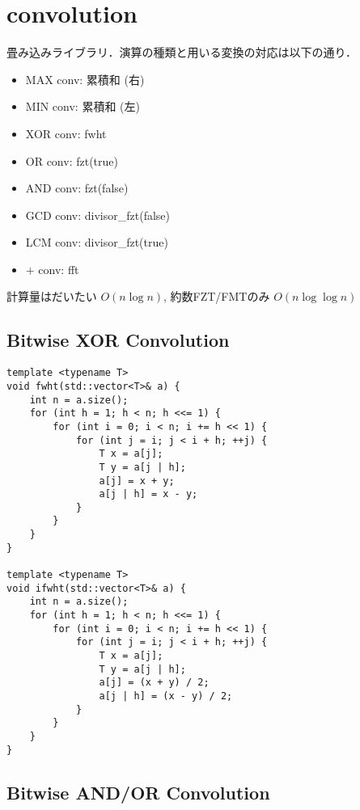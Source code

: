\section{convolution}

\begin{small}
畳み込みライブラリ．演算の種類と用いる変換の対応は以下の通り．

\begin{itemize}
    \item MAX conv: 累積和 (右)
    \item MIN conv: 累積和 (左)
    \item XOR conv: fwht
    \item OR  conv: fzt(true)
    \item AND conv: fzt(false)
    \item GCD conv: divisor\_fzt(false)
    \item LCM conv: divisor\_fzt(true)
    \item $+$ conv: fft
\end{itemize}

計算量はだいたい $O(n\log n)$, 約数FZT/FMTのみ $O(n\log\log n)$
\end{small}

\subsection{Bitwise XOR Convolution}

\begin{lstlisting}
template <typename T>
void fwht(std::vector<T>& a) {
    int n = a.size();
    for (int h = 1; h < n; h <<= 1) {
        for (int i = 0; i < n; i += h << 1) {
            for (int j = i; j < i + h; ++j) {
                T x = a[j];
                T y = a[j | h];
                a[j] = x + y;
                a[j | h] = x - y;
            }
        }
    }
}

template <typename T>
void ifwht(std::vector<T>& a) {
    int n = a.size();
    for (int h = 1; h < n; h <<= 1) {
        for (int i = 0; i < n; i += h << 1) {
            for (int j = i; j < i + h; ++j) {
                T x = a[j];
                T y = a[j | h];
                a[j] = (x + y) / 2;
                a[j | h] = (x - y) / 2;
            }
        }
    }
}
\end{lstlisting}

\subsection{Bitwise AND/OR Convolution}

